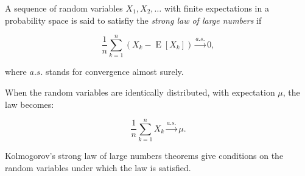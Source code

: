 \documentclass[12pt]{article}
\begin{document}
A sequence of random variables $X_1, X_2,\dots$ with finite expectations
in a probability space is said to satisfiy the \textit{strong law of large numbers} if

$$ \frac{1}{n}\sum_{k=1}^n (X_k -\operatorname{E}[X_k]) \xrightarrow[]{a.s.} 0, $$

where $a.s.$ stands for convergence almost surely.

When the random variables are identically distributed, with expectation $\mu$,
the law becomes:

$$ \frac{1}{n}\sum_{k=1}^n X_k\xrightarrow[]{a.s.} \mu.$$

Kolmogorov's strong law of large numbers theorems give conditions on the random variables under which the law is satisfied.
\end{document}
